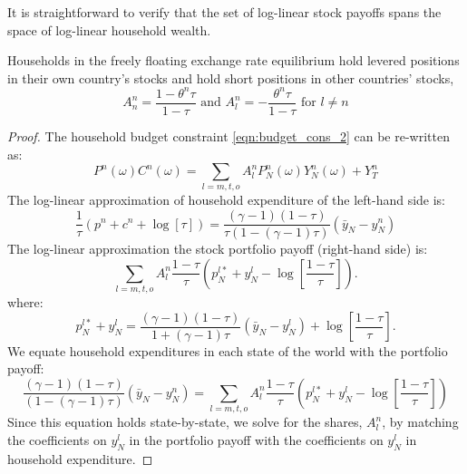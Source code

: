 It is straightforward to verify that the set of log-linear stock
payoffs spans the space of log-linear household wealth.
\begin{lemma}
  Households in the freely floating exchange rate equilibrium hold
  levered positions in their own country's stocks and hold short
  positions in other countries' stocks,
  \begin{equation*}
    A_n^n = \frac{1 - \theta^n \tau}{1 - \tau} \text{ and }
    A_l^n = - \frac{\theta^n \tau}{1 - \tau} \text{ for } l \neq n
  \end{equation*}
  \label{Lemma_AssetPortfolio}
\end{lemma}
\begin{proof}
  The household budget constraint \eqref{eqn:budget_cons_2} can be
  re-written as:
  \begin{equation*}
    P^n(\omega) C^n(\omega)
    = \sum_{l = m, t, o} A_l^n P^n_N(\omega) Y^n_N(\omega) + Y^n_T
  \end{equation*}
  The log-linear approximation of household expenditure of the
  left-hand side is:
  \begin{equation*}
    \frac{1}{\tau} \left( p^n + c^n + \log \left[ \tau \right] \right)
    = \frac{(\gamma - 1)(1 - \tau)}{\tau \left( 1 - (\gamma - 1) \tau \right)}
    \left( \bar{y}_N - y^n_N \right) 
  \end{equation*}
  The log-linear approximation the stock portfolio payoff (right-hand
  side) is:
  \begin{equation*}
    \sum_{l = m, t, o} A_l^n \frac{1 - \tau}{\tau}
    \left( p^{l \ast}_N + y^l_N - \log\left[ \frac{1 - \tau}{\tau} \right] \right).
  \end{equation*}
  where:
  \begin{equation*}
    p^{l \ast}_N + y^l_N
    = \frac{(\gamma - 1)(1 - \tau)}{1 + (\gamma - 1) \tau }
    \left( \bar{y}_N - y^l_N \right) 
    + \log\left[ \frac{1 - \tau}{\tau} \right].
  \end{equation*}
  We equate household expenditures in each state of the world with the
  portfolio payoff:
  \begin{equation*}
    \frac{(\gamma - 1)(1 - \tau)}{\left( 1 - (\gamma - 1) \tau \right)}
    \left( \bar{y}_N - y^n_N \right) 
    = \sum_{l = m, t, o} A_l^n \frac{1 - \tau}{\tau}
    \left( p^{l \ast}_N + y^l_N - \log\left[ \frac{1 - \tau}{\tau} \right] \right)
  \end{equation*}
  Since this equation holds state-by-state, we solve for the shares,
  $A^n_l$, by matching the coefficients on $y^l_N$ in the portfolio
  payoff with the coefficients on $y^l_N$ in household expenditure.
\end{proof}


